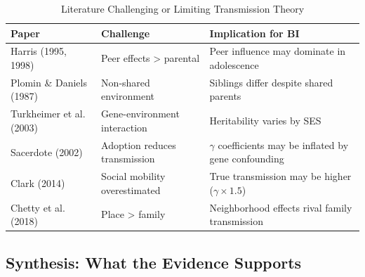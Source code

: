 \begin{table}[htbp]
\centering
\caption{Literature Challenging or Limiting Transmission Theory}
\label{tab:BI-contra-evidence}
\renewcommand{\arraystretch}{1.3}
\footnotesize
\begin{tabular}{@{}p{3.5cm}lp{5cm}@{}}
\toprule
\textbf{Paper} & \textbf{Challenge} & \textbf{Implication for BI} \\
\midrule
Harris (1995, 1998) & Peer effects > parental & Peer influence may dominate in adolescence \\
Plomin \& Daniels (1987) & Non-shared environment & Siblings differ despite shared parents \\
Turkheimer et al. (2003) & Gene-environment interaction & Heritability varies by SES \\
Sacerdote (2002) & Adoption reduces transmission & $\gamma$ coefficients may be inflated by gene confounding \\
Clark (2014) & Social mobility overestimated & True transmission may be higher ($\gamma \times 1.5$) \\
Chetty et al. (2018) & Place > family & Neighborhood effects rival family transmission \\
\bottomrule
\end{tabular}
\end{table}

\subsection{Synthesis: What the Evidence Supports}

